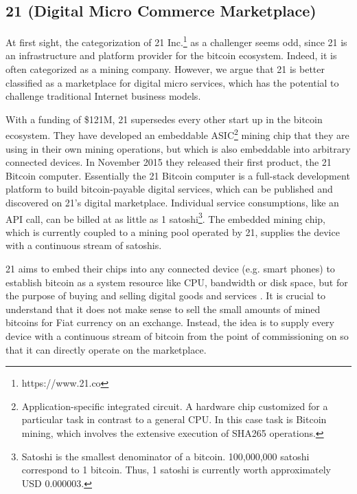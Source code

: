 \subsection{21 (Digital Micro Commerce Marketplace)}
\label{sec:eco21}

At first sight, the categorization of 21 Inc.\footnote{https://www.21.co} as a challenger seems odd, 
since 21 is an infrastructure and platform provider for the bitcoin ecosystem. 
Indeed, it is often categorized as a mining company. However, we argue that 21 
is better classified as a marketplace for digital micro services, which has the 
potential to challenge traditional Internet business models.

With a funding of \$121M, 21 supersedes every other start up in the bitcoin ecosystem. 
They have developed an embeddable ASIC\footnote{ Application-specific integrated 
circuit. A hardware chip customized for a particular task in contrast to a general 
CPU. In this case task is Bitcoin mining, which involves the extensive execution 
of SHA265 operations.} mining chip that they are using in their own mining operations, 
but which is also embeddable into arbitrary connected devices. In November 2015 
they released their first product, the 21 Bitcoin computer. Essentially the 21 
Bitcoin computer is a full-stack development platform to build bitcoin-payable 
digital services, which can be published and discovered on 21's digital marketplace. 
Individual service consumptions, like an API call, can be billed at as little as 
1 satoshi\footnote{Satoshi is the smallest denominator of a bitcoin. 100,000,000 
satoshi correspond to 1 bitcoin. Thus, 1 satoshi is currently worth approximately 
USD 0.000003.}. The embedded mining chip, which is currently coupled to a mining 
pool operated by 21, supplies the device with 
a continuous stream of satoshis.

21 aims to embed their chips into any connected device (e.g. smart phones) to establish 
bitcoin as a system resource like CPU, bandwidth or disk space, but for the purpose 
of buying and selling digital goods and services \parencite{Balaji2015}. It is crucial 
to understand that it does not make sense to sell the small amounts of mined bitcoins 
for Fiat currency on an exchange. Instead, the idea is to supply every device with 
a continuous stream of bitcoin from the point of commissioning on so that it can 
directly operate on the marketplace. 

